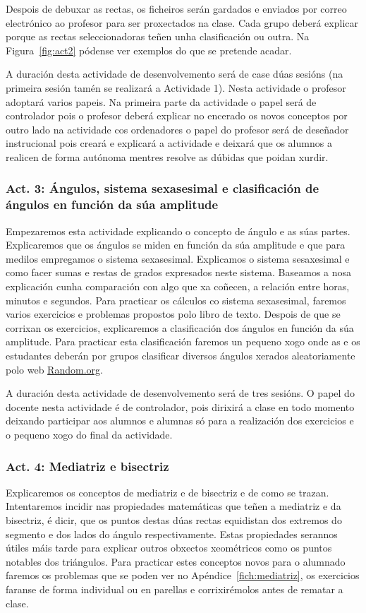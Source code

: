 Despois de debuxar as rectas, os ficheiros serán gardados e enviados por correo electrónico ao profesor para ser proxectados na clase. Cada grupo deberá explicar porque as rectas seleccionadoras teñen unha clasificación ou outra. Na Figura~\ref{fig:act2} pódense ver exemplos do que se pretende acadar.

A duración desta actividade de desenvolvemento será de case dúas sesións (na primeira sesión tamén se realizará a Actividade 1). Nesta actividade o profesor adoptará varios papeis. Na primeira parte da actividade o papel será de controlador pois o profesor deberá explicar no encerado os novos conceptos por outro lado na actividade cos ordenadores o papel do profesor será de deseñador instrucional pois creará e explicará a actividade e deixará que os alumnos a realicen de forma autónoma mentres resolve as dúbidas que poidan xurdir.

\subsubsection{Act. 3: Ángulos, sistema sexasesimal e clasificación de ángulos en función da súa amplitude}\label{act:angulos}
Empezaremos esta actividade explicando o concepto de ángulo e as súas partes. Explicaremos que os ángulos se miden en función da súa amplitude e que para medilos empregamos o sistema sexasesimal. Explicamos o sistema sesaxesimal e como facer sumas e restas de grados expresados neste sistema. Baseamos a nosa explicación cunha comparación con algo que xa coñecen, a relación entre horas, minutos e segundos. Para practicar os cálculos co sistema sexasesimal, faremos varios exercicios e problemas propostos polo libro de texto. Despois de que se corrixan os exercicios, explicaremos a clasificación dos ángulos en función da súa amplitude. Para practicar esta clasificación faremos un pequeno xogo onde as e os estudantes deberán por grupos clasificar diversos ángulos xerados aleatoriamente polo web \href{http://random.org}{Random.org}.


A duración desta actividade de desenvolvemento será de tres sesións. O papel do docente nesta actividade é de controlador, pois dirixirá a clase en todo momento deixando participar aos alumnos e alumnas só para a realización dos exercicios e o pequeno xogo do final da actividade.

\subsubsection{Act. 4: Mediatriz e bisectriz}\label{act:mediatriz}
Explicaremos os conceptos de mediatriz e de bisectriz e de como se trazan. Intentaremos incidir nas propiedades matemáticas que teñen a mediatriz e da bisectriz, é dicir, que os puntos destas dúas rectas equidistan dos extremos do segmento e dos lados do ángulo respectivamente. Estas propiedades serannos útiles máis tarde para explicar outros obxectos xeométricos como os puntos notables dos triángulos. Para practicar estes conceptos novos para o alumnado faremos os problemas que se poden ver no Apéndice~\ref{fich:mediatriz}, os exercicios faranse de forma individual ou en parellas e corrixirémolos antes de rematar a clase.

